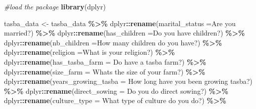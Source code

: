 \documentclass[
]{book}
\newenvironment{Shaded}{\begin{snugshade}}{\end{snugshade}}
\newcommand{\AttributeTok}[1]{\textcolor[rgb]{0.13,0.29,0.53}{#1}}
\newcommand{\CommentTok}[1]{\textcolor[rgb]{0.56,0.35,0.01}{\textit{#1}}}
\newcommand{\FunctionTok}[1]{\textcolor[rgb]{0.13,0.29,0.53}{\textbf{#1}}}
\newcommand{\NormalTok}[1]{#1}
\newcommand{\OtherTok}[1]{\textcolor[rgb]{0.56,0.35,0.01}{#1}}
\newcommand{\SpecialCharTok}[1]{\textcolor[rgb]{0.81,0.36,0.00}{\textbf{#1}}}
\newcommand{\StringTok}[1]{\textcolor[rgb]{0.31,0.60,0.02}{#1}}
\begin{document}
\begin{Shaded}
\begin{Highlighting}[]
\CommentTok{\#load the package}
\FunctionTok{library}\NormalTok{(dplyr)}

\NormalTok{tasba\_data }\OtherTok{\textless{}{-}}\NormalTok{ tasba\_data }\SpecialCharTok{\%\textgreater{}\%}
\NormalTok{  dplyr}\SpecialCharTok{::}\FunctionTok{rename}\NormalTok{(}\AttributeTok{marital\_status =}\StringTok{\textasciigrave{}}\AttributeTok{Are you married?}\StringTok{\textasciigrave{}}\NormalTok{) }\SpecialCharTok{\%\textgreater{}\%}
\NormalTok{  dplyr}\SpecialCharTok{::}\FunctionTok{rename}\NormalTok{(}\AttributeTok{has\_children =}\StringTok{\textasciigrave{}}\AttributeTok{Do you  have children?}\StringTok{\textasciigrave{}}\NormalTok{) }\SpecialCharTok{\%\textgreater{}\%}
\NormalTok{  dplyr}\SpecialCharTok{::}\FunctionTok{rename}\NormalTok{(}\AttributeTok{nb\_children =}\StringTok{\textasciigrave{}}\AttributeTok{How many children do you have?}\StringTok{\textasciigrave{}}\NormalTok{) }\SpecialCharTok{\%\textgreater{}\%}
\NormalTok{  dplyr}\SpecialCharTok{::}\FunctionTok{rename}\NormalTok{(}\AttributeTok{religion =}\StringTok{\textasciigrave{}}\AttributeTok{What is your religion?}\StringTok{\textasciigrave{}}\NormalTok{) }\SpecialCharTok{\%\textgreater{}\%}
\NormalTok{  dplyr}\SpecialCharTok{::}\FunctionTok{rename}\NormalTok{(}\AttributeTok{has\_tasba\_farm =} \StringTok{\textasciigrave{}}\AttributeTok{Do have a tasba farm?}\StringTok{\textasciigrave{}}\NormalTok{) }\SpecialCharTok{\%\textgreater{}\%}
\NormalTok{  dplyr}\SpecialCharTok{::}\FunctionTok{rename}\NormalTok{(}\AttributeTok{size\_farm =} \StringTok{\textasciigrave{}}\AttributeTok{What\textquotesingle{}s the size of your farm?}\StringTok{\textasciigrave{}}\NormalTok{) }\SpecialCharTok{\%\textgreater{}\%}
\NormalTok{  dplyr}\SpecialCharTok{::}\FunctionTok{rename}\NormalTok{(}\AttributeTok{years\_growing\_tasba =} \StringTok{\textasciigrave{}}\AttributeTok{How long have you been growing tasba?}\StringTok{\textasciigrave{}}\NormalTok{) }\SpecialCharTok{\%\textgreater{}\%}
\NormalTok{  dplyr}\SpecialCharTok{::}\FunctionTok{rename}\NormalTok{(}\AttributeTok{direct\_sowing =} \StringTok{\textasciigrave{}}\AttributeTok{Do you do direct sowing?}\StringTok{\textasciigrave{}}\NormalTok{) }\SpecialCharTok{\%\textgreater{}\%}
\NormalTok{  dplyr}\SpecialCharTok{::}\FunctionTok{rename}\NormalTok{(}\AttributeTok{culture\_type =} \StringTok{\textasciigrave{}}\AttributeTok{What type of culture do you do?}\StringTok{\textasciigrave{}}\NormalTok{) }\SpecialCharTok{\%\textgreater{}\%}

\end{Highlighting}
\end{Shaded}
\end{document}
